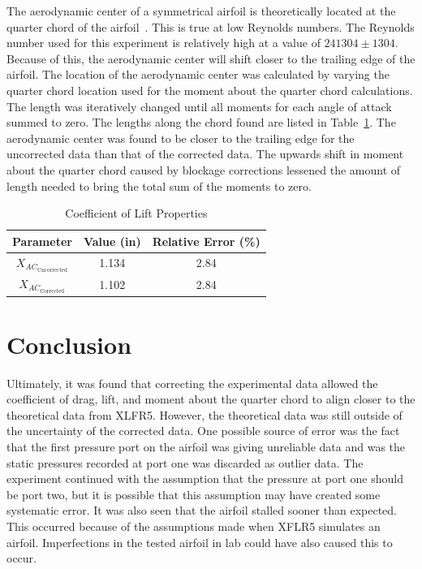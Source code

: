 \documentclass[journal,letterpaper]{IEEEtran}
\renewcommand{\arraystretch}{1.3}
\begin{document}
The aerodynamic center of a symmetrical airfoil is theoretically located at the quarter chord of the airfoil~\cite{Symmetrical}.
This is true at low Reynolds numbers.
The Reynolds number used for this experiment is relatively high at a value of $241304 \pm 1304$.
Because of this, the aerodynamic center will shift closer to the trailing edge of the airfoil.
The location of the aerodynamic center was calculated by varying the quarter chord location used for the moment about the quarter chord calculations.
The length was iteratively changed until all moments for each angle of attack summed to zero.
The lengths along the chord found are listed in Table~\ref{tab:center}.
The aerodynamic center was found to be closer to the trailing edge for the uncorrected data than that of the corrected data.
The upwards shift in moment about the quarter chord caused by blockage corrections lessened the amount of length needed to bring the total sum of the moments to zero.

\begin{table}[H]
    \centering
    \caption{Coefficient of Lift Properties}
    \renewcommand{\arraystretch}{1.2}
    \begin{tabular}{ccc}
    \toprule
    Parameter & Value (in) & Relative Error (\%) \\ \midrule \midrule
    $X_{AC_\text{Uncorrected}}$ & 1.134 & 2.84 \\
    $X_{AC_\text{Corrected}}$ & 1.102 & 2.84 \\ \bottomrule
    \end{tabular}
    \label{tab:center}
\end{table}


\section{Conclusion}


Ultimately, it was found that correcting the experimental data allowed the coefficient of drag, lift, and moment about the quarter chord to align closer to the theoretical data from XLFR5.
However, the theoretical data was still outside of the uncertainty of the corrected data.
One possible source of error was the fact that the first pressure port on the airfoil was giving unreliable data and was the static pressures recorded at port one was discarded as outlier data.
The experiment continued with the assumption that the pressure at port one should be port two, but it is possible that this assumption may have created some systematic error.
It was also seen that the airfoil stalled sooner than expected.
This occurred because of the assumptions made when XFLR5 simulates an airfoil.
Imperfections in the tested airfoil in lab could have also caused this to occur.
\end{document}
